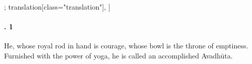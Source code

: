 \begin{alignment}[
  texts=edition[class="edition"];
  translation[class="translation"],
  ]
\begin{translation}
\begin{tlate}
  \paragraph{. 1} He, whose royal rod in hand is courage, whose bowl is the throne of emptiness. Furnished with the power of yoga, he is called an accomplished Avadhūta.
    \end{tlate}
  \end{translation}
\end{alignment}
\pagebreak %
